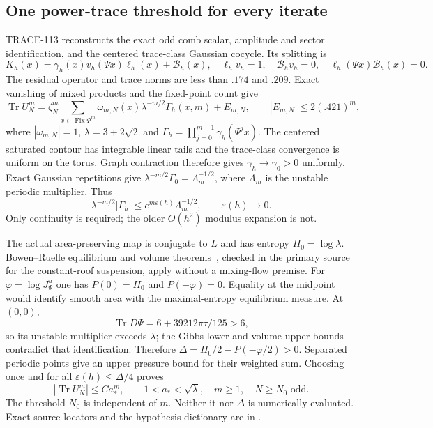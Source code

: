 \subsection{One power-trace threshold for every iterate}
TRACE-113 reconstructs the exact odd comb scalar, amplitude and sector
identification, and the centered trace-class Gaussian cocycle. Its splitting is
\[
K_h(x)=\gamma_h(x)v_h(\Psi x)\ell_h(x)+\mathcal B_h(x),
\quad\ell_hv_h=1,\quad
\mathcal B_hv_h=0,\quad\ell_h(\Psi x)\mathcal B_h(x)=0.
\]
The residual operator and trace norms are less than $.174$ and $.209$.
Exact vanishing of mixed products and the fixed-point count give
\[
\operatorname{Tr}U_N^m=\zeta_N^m
\sum_{x\in\operatorname{Fix}\Psi^m}
\omega_{m,N}(x)\lambda^{-m/2}\Gamma_h(x,m)+E_{m,N},
\qquad |E_{m,N}|\le2(.421)^m,
\]
where $|\omega_{m,N}|=1$, $\lambda=3+2\sqrt2$ and
$\Gamma_h=\prod_{j=0}^{m-1}\gamma_h(\Psi^jx)$.
The centered saturated contour has integrable linear tails and the
trace-class convergence is uniform on the torus. Graph contraction therefore
gives $\gamma_h\to\gamma_0>0$ uniformly. Exact Gaussian repetitions give
$\lambda^{-m/2}\Gamma_0=\Lambda_m^{-1/2}$, where $\Lambda_m$ is the
unstable periodic multiplier. Thus
\[
\lambda^{-m/2}|\Gamma_h|\le e^{m\varepsilon(h)}\Lambda_m^{-1/2},
\qquad\varepsilon(h)\longrightarrow0.
\]
Only continuity is required; the older $O(h^2)$ modulus expansion is not.

The actual area-preserving map is conjugate to $L$ and has entropy
$H_0=\log\lambda$. Bowen--Ruelle equilibrium and volume theorems~\cite[Theorem~3.3, Lemmas~4.1--4.2, Proposition~4.4(b), Remark~5.2]{BowenRuelle1975}, checked
in the primary source for the constant-roof suspension, apply without a
mixing-flow premise. For $\varphi=\log J^u_\Psi$ one has
$P(0)=H_0$ and $P(-\varphi)=0$. Equality at the midpoint would identify
smooth area with the maximal-entropy equilibrium measure. At $(0,0)$,
\[
\operatorname{Tr}D\Psi=6+39212\pi\tau/125>6,
\]
so its unstable multiplier exceeds $\lambda$; the Gibbs lower and volume
upper bounds contradict that identification. Therefore
$\Delta=H_0/2-P(-\varphi/2)>0$.
Separated periodic points give an upper pressure bound for their weighted
sum. Choosing once and for all $\varepsilon(h)\le\Delta/4$ proves
\[
\boxed{\quad |\operatorname{Tr}U_N^m|\le Ca_*^m,
\qquad 1<a_*<\sqrt\lambda,\quad
m\ge1,\quad N\ge N_0\text{ odd}.\quad}
\]
The threshold $N_0$ is independent of $m$. Neither it nor $\Delta$ is
numerically evaluated. Exact source locators and the hypothesis dictionary
are in .

